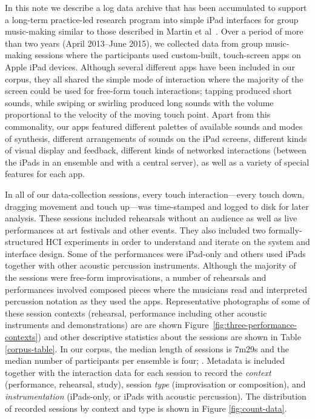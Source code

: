 \documentclass{sigchi}
\begin{document}
In this note we describe a log data archive that has been accumulated
to support a long-term practice-led research program into simple iPad
interfaces for group music-making similar to those described in Martin
et al~\cite{Martin:2014cr}. Over a period of more than two years
(April 2013--June 2015), we collected data from group music-making
sessions where the participants used custom-built, touch-screen apps
on Apple iPad devices. 
Although several different apps have been
included in our corpus, they all shared the simple mode of interaction
where the majority of the screen could be used for free-form touch
interactions; tapping produced short sounds, while swiping or swirling
produced long sounds with the volume proportional to the velocity of
the moving touch point. Apart from this commonality, our apps featured
different palettes of available sounds and modes of synthesis,
different arrangements of sounds on the iPad screens, different kinds
of visual display and feedback, different kinds of networked
interactions (between the iPads in an ensemble and with a central
server), as well as a variety of special features for each app.

In all of our data-collection sessions, every touch
interaction---every touch down, dragging movement and touch up---was
time-stamped and logged to disk for later analysis. These sessions
included rehearsals without an audience as well as live performances
at art festivals and other events. They also included two
formally-structured HCI experiments in order to understand and iterate
on the system and interface design. Some of the performances were
iPad-only and others used iPads together with other acoustic
percussion instruments. Although the majority of the sessions were
free-form improvisations, a number of rehearsals and performances
involved composed pieces where the musicians read and interpreted
percussion notation as they used the apps. Representative photographs
of some of these session contexts (rehearsal, performance including
other acoustic instruments and demonstrations) are are shown
Figure~\ref{fig:three-performance-contexts}) and other descriptive
statistics about the sessions are shown in Table \ref{corpus-table}.
In our corpus, the median length of sessions is 7m29s and the median
number of participants per ensemble is four; . Metadata is included
together with the interaction data for each session to record the
\emph{context} (performance, rehearsal, study), session \emph{type}
(improvisation or composition), and \emph{instrumentation}
(iPads-only, or iPads with acoustic percussion). The distribution of
recorded sessions by context and type is shown in Figure
\ref{fig:count-data}.
\end{document}

